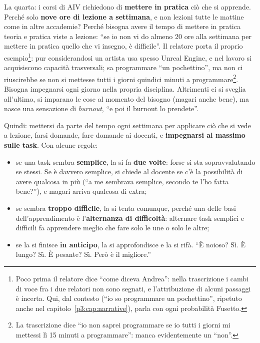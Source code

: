 La quarta: i corsi di AIV richiedono di \textbf{mettere in pratica} ciò che
si apprende. Perché solo \textbf{nove ore di lezione a settimana}, e non
lezioni tutte le mattine come in altre accademie? Perché bisogna avere il
tempo di mettere in pratica teoria e pratica viste a lezione: ``se io non vi
do almeno 20 ore alla settimana per mettere in pratica quello che vi insegno,
è difficile''. Il relatore porta il proprio esempio\footnote{Poco prima il relatore dice ``come diceva Andrea'': nella trascrizione i cambi di voce fra i due relatori non sono segnati, e l'attribuzione di alcuni passaggi è incerta. Qui, dal contesto (``io so programmare un pochettino'', ripetuto anche nel capitolo~\ref{p3:cap:narrative}), parla con ogni probabilità Fusetto.}: pur considerandosi un artista usa spesso Unreal Engine, e nel lavoro si acquisiscono capacità trasversali; sa
programmare ``un pochettino'', ma non ci riuscirebbe se non si mettesse
tutti i giorni quindici minuti a programmare\footnote{La trascrizione dice
``io non saprei programmare se io tutti i giorni mi mettessi lì 15 minuti a
programmare'': manca evidentemente un ``non''.}. Bisogna impegnarsi ogni
giorno nella propria disciplina. Altrimenti ci si sveglia all'ultimo, si
imparano le cose al momento del bisogno (magari anche bene), ma nasce una
sensazione di \emph{burnout}, ``e poi il burnout lo prendete''.

Quindi: mettersi da parte del tempo ogni settimana per applicare ciò che si
vede a lezione, farsi domande, fare domande ai docenti, e
\textbf{impegnarsi al massimo sulle task}. Con alcune regole:
\begin{itemize}
  \item se una task sembra \textbf{semplice}, la si fa \textbf{due volte}:
        forse si sta sopravvalutando se stessi. Se è davvero semplice, si
        chiede al docente se c'è la possibilità di avere qualcosa in più
        (``a me sembrava semplice, secondo te l'ho fatta bene?''), e magari
        arriva qualcosa di extra;
  \item se sembra \textbf{troppo difficile}, la si tenta comunque, perché
        una delle basi dell'apprendimento è l'\textbf{alternanza di
        difficoltà}: alternare task semplici e difficili fa apprendere
        meglio che fare solo le une o solo le altre;
  \item se la si finisce \textbf{in anticipo}, la si approfondisce e la si
        rifà. ``È noioso? Sì. È lungo? Sì. È pesante? Sì. Però è il
        migliore.''
\end{itemize}

